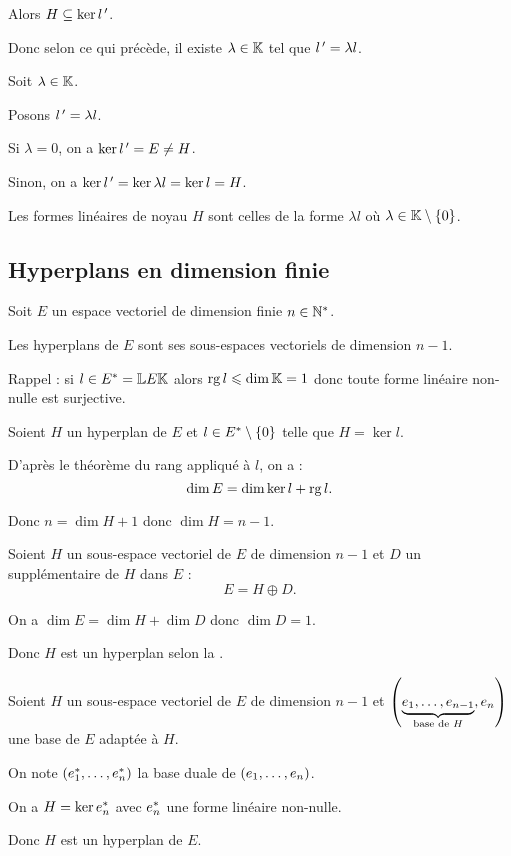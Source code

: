\begin{dem}
Alors \(H\subseteq\ker l^{\,\prime}\).

Donc selon ce qui précède, il existe \(\lambda\in\mathbb{K}\) tel que \(l^{\,\prime}=\lambda l\).

\synthese

Soit \(\lambda\in\mathbb{K}\).

Posons \(l^{\,\prime}=\lambda l\).

Si \(\lambda=0\), on a \(\ker l^{\,\prime}=E\not=H\).

Sinon, on a \(\ker l^{\,\prime}=\ker\lambda l=\ker l=H\).

\conclusion Les formes linéaires de noyau \(H\) sont celles de la forme \(\lambda l\) où \(\lambda\in\mathbb{K}\setminus\left\lbrace0\right\rbrace\).
\end{dem}

\subsection{Hyperplans en dimension finie}

\begin{prop}
Soit \(E\) un espace vectoriel de dimension finie \(n\in\mathbb{N}^*\).

Les hyperplans de \(E\) sont ses sous-espaces vectoriels de dimension \(n-1\).
\end{prop}

\begin{dem}
Rappel : si \(l\in E^{*}=\mathbb{L}{E}{\mathbb{K}}\) alors \(\operatorname{rg} l\leqslant\dim\mathbb{K}=1\) donc toute forme linéaire non-nulle est surjective.

\incdir

Soient \(H\) un hyperplan de \(E\) et \(l\in E^{*}\setminus\left\lbrace0\right\rbrace\) telle que \(H=\ker l\).

D'après le théorème du rang appliqué à \(l\), on a : \[\dim E=\dim\ker l+\operatorname{rg} l.\]

Donc \(n=\dim H+1\) donc \(\dim H=n-1\).

\increc

Soient \(H\) un sous-espace vectoriel de \(E\) de dimension \(n-1\) et \(D\) un supplémentaire de \(H\) dans \(E\) : \[E=H\oplus D.\]

On a \(\dim E=\dim H+\dim D\) donc \(\dim D=1\).

Donc \(H\) est un hyperplan selon la .
\end{dem}

\begin{dem}
Soient \(H\) un sous-espace vectoriel de \(E\) de dimension \(n-1\) et \(\left(\underbrace{e_1,\dots,e_{n-1}}_{\text{base de }H},e_n\right)\) une base de \(E\) adaptée à \(H\).

On note \(\left(e_1^{*},\dots,e_n^{*}\right)\) la base duale de \(\left(e_1,\dots,e_n\right)\).

On a \(H=\ker e_n^{*}\) avec \(e_n^{*}\) une forme linéaire non-nulle.

Donc \(H\) est un hyperplan de \(E\).
\end{dem}

